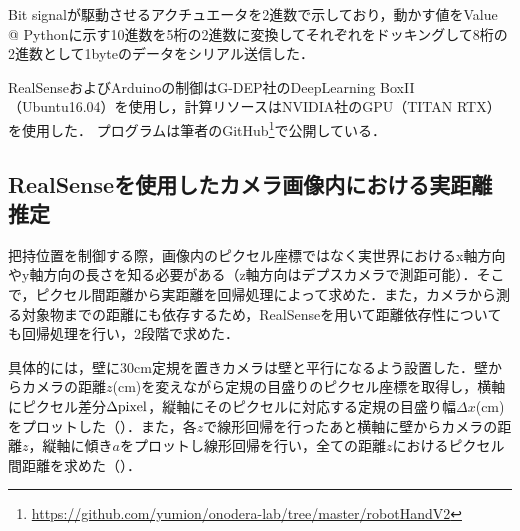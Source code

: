 Bit signalが駆動させるアクチュエータを2進数で示しており，動かす値をValue @ Pythonに示す10進数を5桁の2進数に変換してそれぞれをドッキングして8桁の2進数として1byteのデータをシリアル送信した．

RealSenseおよびArduinoの制御はG-DEP社のDeepLearning BoxII（Ubuntu16.04）を使用し，計算リソースはNVIDIA社のGPU（TITAN RTX）を使用した．
プログラムは筆者のGitHub\footnote{\url{https://github.com/yumion/onodera-lab/tree/master/robotHandV2}}で公開している．


\subsection{RealSenseを使用したカメラ画像内における実距離推定}
把持位置を制御する際，画像内のピクセル座標ではなく実世界におけるx軸方向やy軸方向の長さを知る必要がある（z軸方向はデプスカメラで測距可能）．そこで，ピクセル間距離から実距離を回帰処理によって求めた．また，カメラから測る対象物までの距離にも依存するため，RealSenseを用いて距離依存性についても回帰処理を行い，2段階で求めた．

具体的には，壁に30cm定規を置きカメラは壁と平行になるよう設置した．壁からカメラの距離$z$(cm)を変えながら定規の目盛りのピクセル座標を取得し，横軸にピクセル差分$\Delta \rm{pixel}$，縦軸にそのピクセルに対応する定規の目盛り幅$\Delta x$(cm)をプロットした（）．また，各$z$で線形回帰を行ったあと横軸に壁からカメラの距離$z$，縦軸に傾き$a$をプロットし線形回帰を行い，全ての距離$z$におけるピクセル間距離を求めた（）．

